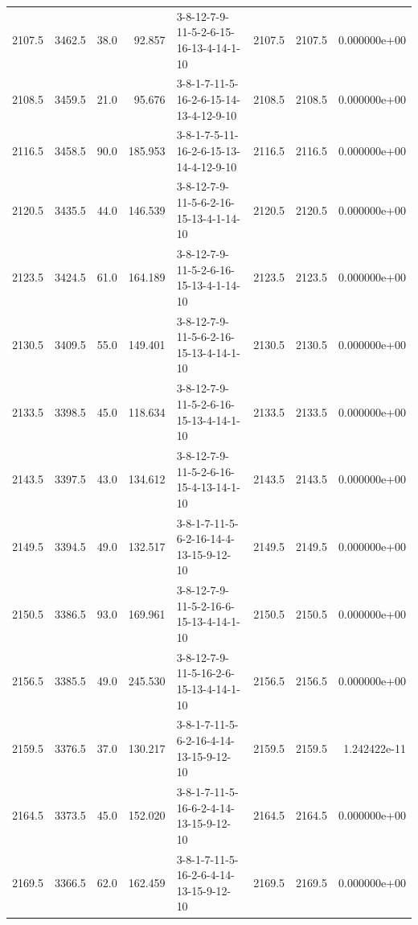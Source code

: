 \begin{tabular}{rrrrlrrr}
 2107.5 &  3462.5 &           38.0 &             92.857 &  3-8-12-7-9-11-5-2-6-15-16-13-4-14-1-10 &        2107.5 &          2107.5 &  0.000000e+00 \\
 2108.5 &  3459.5 &           21.0 &             95.676 &  3-8-1-7-11-5-16-2-6-15-14-13-4-12-9-10 &        2108.5 &          2108.5 &  0.000000e+00 \\
 2116.5 &  3458.5 &           90.0 &            185.953 &  3-8-1-7-5-11-16-2-6-15-13-14-4-12-9-10 &        2116.5 &          2116.5 &  0.000000e+00 \\
 2120.5 &  3435.5 &           44.0 &            146.539 &  3-8-12-7-9-11-5-6-2-16-15-13-4-1-14-10 &        2120.5 &          2120.5 &  0.000000e+00 \\
 2123.5 &  3424.5 &           61.0 &            164.189 &  3-8-12-7-9-11-5-2-6-16-15-13-4-1-14-10 &        2123.5 &          2123.5 &  0.000000e+00 \\
 2130.5 &  3409.5 &           55.0 &            149.401 &  3-8-12-7-9-11-5-6-2-16-15-13-4-14-1-10 &        2130.5 &          2130.5 &  0.000000e+00 \\
 2133.5 &  3398.5 &           45.0 &            118.634 &  3-8-12-7-9-11-5-2-6-16-15-13-4-14-1-10 &        2133.5 &          2133.5 &  0.000000e+00 \\
 2143.5 &  3397.5 &           43.0 &            134.612 &  3-8-12-7-9-11-5-2-6-16-15-4-13-14-1-10 &        2143.5 &          2143.5 &  0.000000e+00 \\
 2149.5 &  3394.5 &           49.0 &            132.517 &  3-8-1-7-11-5-6-2-16-14-4-13-15-9-12-10 &        2149.5 &          2149.5 &  0.000000e+00 \\
 2150.5 &  3386.5 &           93.0 &            169.961 &  3-8-12-7-9-11-5-2-16-6-15-13-4-14-1-10 &        2150.5 &          2150.5 &  0.000000e+00 \\
 2156.5 &  3385.5 &           49.0 &            245.530 &  3-8-12-7-9-11-5-16-2-6-15-13-4-14-1-10 &        2156.5 &          2156.5 &  0.000000e+00 \\
 2159.5 &  3376.5 &           37.0 &            130.217 &  3-8-1-7-11-5-6-2-16-4-14-13-15-9-12-10 &        2159.5 &          2159.5 &  1.242422e-11 \\
 2164.5 &  3373.5 &           45.0 &            152.020 &  3-8-1-7-11-5-16-6-2-4-14-13-15-9-12-10 &        2164.5 &          2164.5 &  0.000000e+00 \\
 2169.5 &  3366.5 &           62.0 &            162.459 &  3-8-1-7-11-5-16-2-6-4-14-13-15-9-12-10 &        2169.5 &          2169.5 &  0.000000e+00 \\

\end{tabular}
